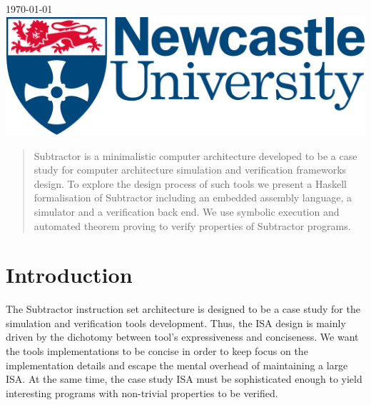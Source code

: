 \begin{titlepage}

{\large \today}\\[2cm] %


\includegraphics[scale=0.5]{logo.png}\\[1cm] %


\vfill %

\end{titlepage}

\begin{abstract}
Subtractor is a minimalistic computer architecture developed to be
a case study for computer architecture simulation and verification frameworks
design. To explore the design process of such tools we present a Haskell formalisation of Subtractor including an embedded assembly language, a simulator and a verification back end. We use symbolic execution and automated theorem proving to verify properties of Subtractor programs.

\end{abstract}

\tableofcontents

\section{Introduction}

The Subtractor instruction set architecture is designed to be a case study for
the simulation and verification tools development. Thus, the ISA design is mainly driven by the dichotomy between tool's expressiveness and conciseness.
We want the tools implementations to be concise in order to keep focus on the
implementation details and escape the mental overhead of maintaining a large ISA. At the same time, the case study ISA must be sophisticated enough to
yield interesting programs with non-trivial properties to be verified.

